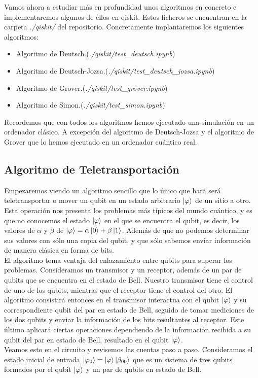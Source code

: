 \documentclass[a4paper]{article}
\numberwithin{equation}{section}
\begin{document}
Vamos ahora a estudiar más en profundidad unos algoritmos en concreto e implementaremos algunos de ellos en qiskit. Estos ficheros se encuentran en la carpeta \textit{./qiskit/} del repositorio. Concretamente implantaremos los siguientes algoritmos:
\begin{itemize}
\item Algoritmo de Deutsch.(\textit{./qiskit/test\_deutsch.ipynb})

\item Algoritmo de Deutsch-Jozsa.(\textit{./qiskit/test\_deutsch\_jozsa.ipynb})

\item Algoritmo de Grover.(\textit{./qiskit/test\_grover.ipynb})

\item Algoritmo de Simon.(\textit{./qiskit/test\_simon.ipynb})
\end{itemize}
Recordemos que con todos los algoritmos hemos ejecutado una simulación en un ordenador clásico. A excepción del algoritmo de Deutsch-Jozsa y el algoritmo de Grover que lo hemos ejecutado en un ordenador cuántico real.


\subsection{Algoritmo de Teletransportación}
Empezaremos viendo un algoritmo sencillo que lo único que hará será teletransportar o mover un qubit en un estado arbitrario $\ket{\varphi}$ de un sitio a otro. Esta operación nos presenta los problemas más típicos del mundo cuántico, y es que no conocemos el estado $\ket{\varphi}$ en el que se encuentra el qubit, es decir, los valores de $\alpha$ y $\beta$ de $\ket{\varphi} = \alpha\ket{0} + \beta\ket{1}$. Además de que no podemos determinar sus valores con sólo una copia del qubit, y que sólo sabemos enviar información de manera clásica en forma de bits.\\

El algoritmo toma ventaja del enlazamiento entre qubits para superar los problemas. Consideramos un transmisor y un receptor, además de un par de qubits que se encuentra en el estado de Bell. Nuestro transmisor tiene el control de uno de los qubits, mientras que el receptor tiene el control del otro. El algoritmo consistirá entonces en el transmisor interactua con el qubit $\ket{\varphi}$ y su correspondiente qubit del par en estado de Bell, seguido de tomar mediciones de los dos qubits y enviar la información de los bits resultantes al receptor. Este último aplicará ciertas operaciones dependiendo de la información recibida a su qubit del par en estado de Bell, resultado en el qubit $\ket{\varphi}$.\\
Veamos esto en el circuito y revisemos las cuentas paso a paso. Consideramos el estado inicial de entrada $\ket{\varphi_0} = \ket{\varphi}\ket{\beta_{00}}$ que es un sistema de tres qubits formados por el qubit $\ket{\varphi}$ y un par de qubits en estado de Bell.
\end{document}
